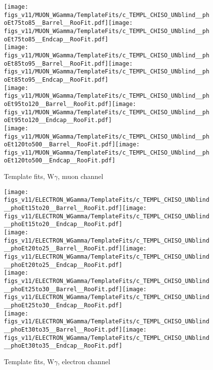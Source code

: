 \begin{figure}[htb]
  \begin{center}
   \texttt{[image: figs\_v11/MUON\_WGamma/TemplateFits/c\_TEMPL\_CHISO\_UNblind\_\_phoEt75to85\_\_Barrel\_\_RooFit.pdf]}\texttt{[image: figs\_v11/MUON\_WGamma/TemplateFits/c\_TEMPL\_CHISO\_UNblind\_\_phoEt75to85\_\_Endcap\_\_RooFit.pdf]}\\
   \texttt{[image: figs\_v11/MUON\_WGamma/TemplateFits/c\_TEMPL\_CHISO\_UNblind\_\_phoEt85to95\_\_Barrel\_\_RooFit.pdf]}\texttt{[image: figs\_v11/MUON\_WGamma/TemplateFits/c\_TEMPL\_CHISO\_UNblind\_\_phoEt85to95\_\_Endcap\_\_RooFit.pdf]}\\
   \texttt{[image: figs\_v11/MUON\_WGamma/TemplateFits/c\_TEMPL\_CHISO\_UNblind\_\_phoEt95to120\_\_Barrel\_\_RooFit.pdf]}\texttt{[image: figs\_v11/MUON\_WGamma/TemplateFits/c\_TEMPL\_CHISO\_UNblind\_\_phoEt95to120\_\_Endcap\_\_RooFit.pdf]}\\
   \texttt{[image: figs\_v11/MUON\_WGamma/TemplateFits/c\_TEMPL\_CHISO\_UNblind\_\_phoEt120to500\_\_Barrel\_\_RooFit.pdf]}\texttt{[image: figs\_v11/MUON\_WGamma/TemplateFits/c\_TEMPL\_CHISO\_UNblind\_\_phoEt120to500\_\_Endcap\_\_RooFit.pdf]}\\
  \label{fig:templateFits_CHISO_MUON_3}
  \caption{Template fits, W$\gamma$, muon channel}
  \end{center}
\end{figure}

\begin{figure}[htb]
  \begin{center}
   \texttt{[image: figs\_v11/ELECTRON\_WGamma/TemplateFits/c\_TEMPL\_CHISO\_UNblind\_\_phoEt15to20\_\_Barrel\_\_RooFit.pdf]}\texttt{[image: figs\_v11/ELECTRON\_WGamma/TemplateFits/c\_TEMPL\_CHISO\_UNblind\_\_phoEt15to20\_\_Endcap\_\_RooFit.pdf]}\\
   \texttt{[image: figs\_v11/ELECTRON\_WGamma/TemplateFits/c\_TEMPL\_CHISO\_UNblind\_\_phoEt20to25\_\_Barrel\_\_RooFit.pdf]}\texttt{[image: figs\_v11/ELECTRON\_WGamma/TemplateFits/c\_TEMPL\_CHISO\_UNblind\_\_phoEt20to25\_\_Endcap\_\_RooFit.pdf]}\\
   \texttt{[image: figs\_v11/ELECTRON\_WGamma/TemplateFits/c\_TEMPL\_CHISO\_UNblind\_\_phoEt25to30\_\_Barrel\_\_RooFit.pdf]}\texttt{[image: figs\_v11/ELECTRON\_WGamma/TemplateFits/c\_TEMPL\_CHISO\_UNblind\_\_phoEt25to30\_\_Endcap\_\_RooFit.pdf]}\\
   \texttt{[image: figs\_v11/ELECTRON\_WGamma/TemplateFits/c\_TEMPL\_CHISO\_UNblind\_\_phoEt30to35\_\_Barrel\_\_RooFit.pdf]}\texttt{[image: figs\_v11/ELECTRON\_WGamma/TemplateFits/c\_TEMPL\_CHISO\_UNblind\_\_phoEt30to35\_\_Endcap\_\_RooFit.pdf]}\\
  \label{fig:templateFits_CHISO_ELECTRON_1}
  \caption{Template fits, W$\gamma$, electron channel}
  \end{center}
\end{figure}

